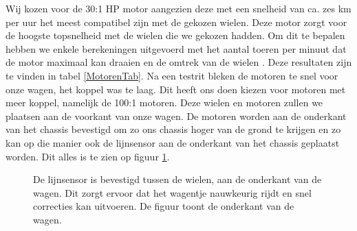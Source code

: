 \documentclass[a4paper,kulak]{kulakarticle}
\begin{document}
Wij kozen voor de 30:1 HP motor aangezien deze met een snelheid van ca. zes km per uur het meest compatibel zijn met de gekozen wielen. Deze motor zorgt voor de hoogste topsnelheid met de wielen die we gekozen hadden. Om dit te bepalen hebben we enkele berekeningen uitgevoerd met het aantal toeren per minuut dat de motor maximaal kan draaien en de omtrek van de wielen \cite{converter}. Deze resultaten zijn te vinden in tabel \ref{MotorenTab}. Na een testrit bleken de motoren te snel voor onze wagen, het koppel was te laag. Dit heeft ons doen kiezen voor motoren met meer koppel, namelijk de 100:1 motoren. Deze wielen en motoren zullen we plaatsen aan de voorkant van onze wagen. De motoren worden aan de onderkant van het chassis bevestigd om zo ons chassis hoger van de grond te krijgen en zo kan op die manier ook de lijnsensor aan de onderkant van het chassis geplaatst worden. Dit alles is te zien op figuur \ref{fig:Onderkant}.

\begin{figure} [h]
	
	\caption{De lijnsensor is bevestigd tussen de wielen, aan de onderkant van de wagen. Dit zorgt ervoor dat het wagentje nauwkeurig rijdt en snel correcties kan uitvoeren. De figuur toont de onderkant van de wagen.}\label{fig:Onderkant}
\end{figure}
\end{document}
